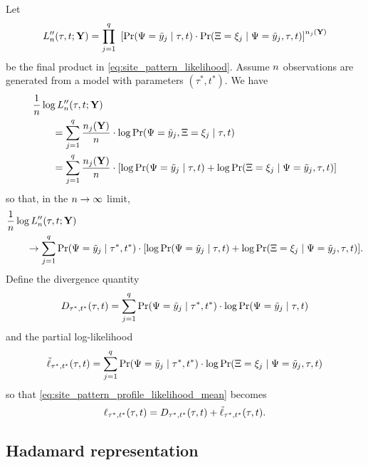 Let
$$
L_n''(\tau, t; \mathbf{Y}) = \prod_{j=1}^{q} \ \left[\Pr(\Psi=\tilde{y}_j \mid \tau, t) \cdot \Pr(\Xi=\xi_j \mid \Psi=\tilde{y}_j, \tau, t)\right] ^{n_j(\mathbf{Y})}
$$
be the final product in \eqref{eq:site_pattern_likelihood}.
Assume $n$ observations are generated from a model with parameters $(\tau^*, t^*)$.
We have
\begin{equation*}
\begin{split}
&    \frac{1}{n} \log L_n''(\tau, t; \mathbf{Y}) \\
&\qquad = \sum_{j=1}^q \frac{n_j(\mathbf{Y})}{n}\cdot  \log \Pr(\Psi=\tilde{y}_j, \Xi=\xi_j \mid \tau, t) \\
&\qquad = \sum_{j=1}^q \frac{n_j(\mathbf{Y})}{n}\cdot [\log \Pr(\Psi=\tilde{y}_j \mid \tau, t) +
            \log \Pr(\Xi=\xi_j \mid \Psi=\tilde{y}_j , \tau, t)]
\end{split}
\end{equation*}
so that, in the $n\rightarrow\infty$ limit,
\begin{equation}
\begin{split}
&    \frac{1}{n} \log L_n''(\tau, t; \mathbf{Y}) \\
&\qquad \rightarrow \sum_{j=1}^q \Pr(\Psi=\tilde{y}_j \mid \tau^*, t^*) \cdot [\log \Pr(\Psi=\tilde{y}_j \mid \tau, t) + \log \Pr(\Xi=\xi_j \mid \Psi=\tilde{y}_j , \tau, t)]. \label{eq:site_pattern_profile_likelihood_mean}
\end{split}
\end{equation}
Define the divergence quantity
$$
D_{\tau^*,t^*}(\tau,t) = \sum_{j=1}^q \Pr(\Psi=\tilde{y}_j \mid \tau^*, t^*)\cdot\log \Pr(\Psi=\tilde{y}_j \mid \tau, t)
$$
and the partial log-likelihood
$$
\tilde{\ell}_{\tau^*,t^*}(\tau, t) = \sum_{j=1}^q \Pr(\Psi=\tilde{y}_j \mid \tau^*, t^*)\cdot\log \Pr(\Xi=\xi_j \mid \Psi = \tilde{y}_j, \tau, t)
$$
so that \eqref{eq:site_pattern_profile_likelihood_mean} becomes
\begin{equation}
    \label{eq:log_likelihood_simplified}
    \ell_{\tau^*,t^*}(\tau, t) = D_{\tau^*,t^*}(\tau,t) + \tilde{\ell}_{\tau^*,t^*}(\tau, t).
\end{equation}

\subsection*{Hadamard representation}

